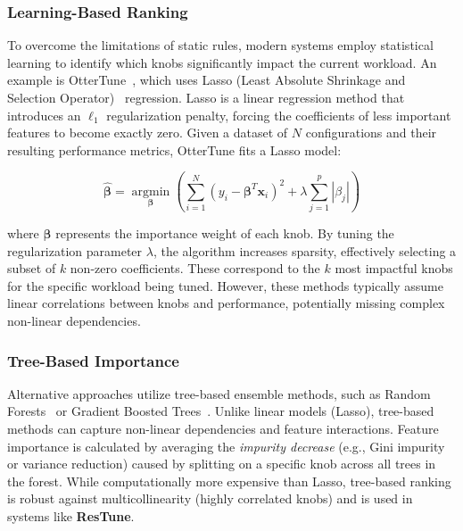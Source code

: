 \subsubsection{Learning-Based Ranking}

To overcome the limitations of static rules, modern systems employ statistical learning to identify which knobs significantly impact the current workload.
An example is OtterTune~\cite{ottertune}, which uses Lasso (Least Absolute Shrinkage and Selection Operator)~\cite{lasso} regression.
Lasso is a linear regression method that introduces an $\ell_1$ regularization penalty, forcing the coefficients of less important features to become exactly zero.
Given a dataset of $N$ configurations and their resulting performance metrics, OtterTune fits a Lasso model:

\[\hat{\boldsymbol{\beta}} = \operatorname*{argmin}_{\boldsymbol{\beta}} \left( \sum_{i=1}^{N} (y_i - \boldsymbol{\beta}^T \mathbf{x}_i)^2 + \lambda \sum_{j=1}^{p} |\beta_j| \right)\]

where $\boldsymbol{\beta}$ represents the importance weight of each knob.
By tuning the regularization parameter $\lambda$, the algorithm increases sparsity, effectively selecting a subset of $k$ non-zero coefficients.
These correspond to the $k$ most impactful knobs for the specific workload being tuned.
However, these methods typically assume linear correlations between knobs and performance, potentially missing complex non-linear dependencies.

\subsubsection{Tree-Based Importance}

Alternative approaches utilize tree-based ensemble methods, such as Random Forests~\cite{random_forests} or Gradient Boosted Trees~\cite{gbdt}.
Unlike linear models (Lasso), tree-based methods can capture non-linear dependencies and feature interactions.
Feature importance is calculated by averaging the \textit{impurity decrease} (e.g., Gini impurity or variance reduction) caused by splitting on a specific knob across all trees in the forest.
While computationally more expensive than Lasso, tree-based ranking is robust against multicollinearity (highly correlated knobs) and is used in systems like \textbf{ResTune}.



